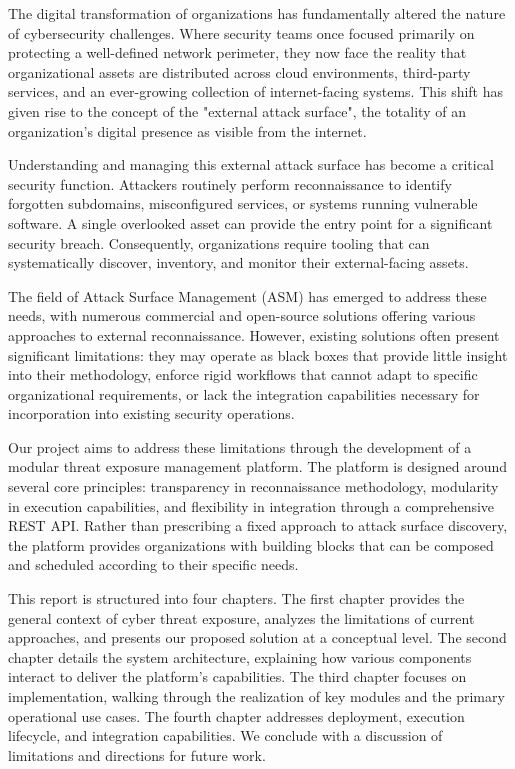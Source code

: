\documentclass[a4paper,12pt]{report}
\begin{document}
The digital transformation of organizations has fundamentally altered the nature of cybersecurity challenges. Where security teams once focused primarily on protecting a well-defined network perimeter, they now face the reality that organizational assets are distributed across cloud environments, third-party services, and an ever-growing collection of internet-facing systems. This shift has given rise to the concept of the "external attack surface", the totality of an organization's digital presence as visible from the internet.\hfill \break

Understanding and managing this external attack surface has become a critical security function. Attackers routinely perform reconnaissance to identify forgotten subdomains, misconfigured services, or systems running vulnerable software. A single overlooked asset can provide the entry point for a significant security breach. Consequently, organizations require tooling that can systematically discover, inventory, and monitor their external-facing assets.\hfill \break

The field of Attack Surface Management (ASM) has emerged to address these needs, with numerous commercial and open-source solutions offering various approaches to external reconnaissance. However, existing solutions often present significant limitations: they may operate as black boxes that provide little insight into their methodology, enforce rigid workflows that cannot adapt to specific organizational requirements, or lack the integration capabilities necessary for incorporation into existing security operations.\hfill \break

Our project aims to address these limitations through the development of a modular threat exposure management platform. The platform is designed around several core principles: transparency in reconnaissance methodology, modularity in execution capabilities, and flexibility in integration through a comprehensive REST API. Rather than prescribing a fixed approach to attack surface discovery, the platform provides organizations with building blocks that can be composed and scheduled according to their specific needs.\hfill \break

This report is structured into four chapters. The first chapter provides the general context of cyber threat exposure, analyzes the limitations of current approaches, and presents our proposed solution at a conceptual level. The second chapter details the system architecture, explaining how various components interact to deliver the platform's capabilities. The third chapter focuses on implementation, walking through the realization of key modules and the primary operational use cases. The fourth chapter addresses deployment, execution lifecycle, and integration capabilities. We conclude with a discussion of limitations and directions for future work.\hfill \break
\end{document}
